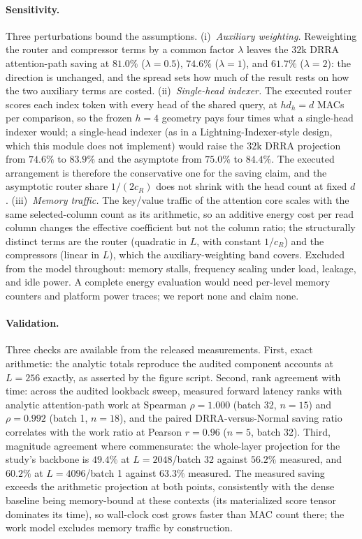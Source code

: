 \paragraph{Sensitivity.} Three perturbations bound the assumptions.
(i)~\emph{Auxiliary weighting.} Reweighting the router and compressor
terms by a common factor $\lambda$ leaves the $32$k DRRA attention-path
saving at $81.0\%$ ($\lambda{=}0.5$), $74.6\%$ ($\lambda{=}1$), and
$61.7\%$ ($\lambda{=}2$): the direction is unchanged, and the spread sets
how much of the result rests on how the two auxiliary terms are costed.
(ii)~\emph{Single-head indexer.} The executed router scores each index
token with every head of the shared query, at $h d_h = d$ MACs per
comparison, so the frozen $h{=}4$ geometry pays four times what a
single-head indexer would; a single-head indexer (as in a
Lightning-Indexer-style design, which this module does not implement)
would raise the $32$k DRRA projection from $74.6\%$ to $83.9\%$ and the
asymptote from $75.0\%$ to $84.4\%$. The executed
arrangement is therefore the conservative one for the saving claim, and
the asymptotic router share $1/(2 c_R)$ does not shrink with the head
count at fixed $d$.
(iii)~\emph{Memory traffic.} The key/value traffic of the attention core
scales with the same selected-column count as its arithmetic, so an
additive energy cost per read column changes the effective coefficient
but not the column ratio; the structurally distinct terms are the router
(quadratic in $L$, with constant $1/c_R$) and the compressors (linear in
$L$), which the auxiliary-weighting band covers. Excluded from the model
throughout: memory stalls, frequency scaling under load, leakage, and
idle power. A complete energy evaluation would need per-level memory
counters and platform power traces; we report none and claim none.

\paragraph{Validation.} Three checks are available from the released
measurements. First, exact arithmetic: the analytic totals reproduce the
audited component accounts at $L{=}256$ exactly, as asserted by the figure
script. Second, rank agreement with time: across the audited lookback
sweep, measured forward latency ranks with analytic attention-path work at
Spearman $\rho = 1.000$ (batch 32, $n{=}15$) and $\rho = 0.992$
(batch 1, $n{=}18$), and the paired DRRA-versus-Normal saving ratio
correlates with the work ratio at Pearson $r = 0.96$ ($n{=}5$, batch 32).
Third, magnitude agreement where commensurate: the whole-layer projection
for the study's backbone is $49.4\%$ at $L{=}2048$/batch 32 against
$56.2\%$ measured, and $60.2\%$ at $L{=}4096$/batch 1 against $63.3\%$
measured. The measured saving exceeds the arithmetic projection at both
points, consistently with the dense baseline being memory-bound at these
contexts (its materialized score tensor dominates its time), so wall-clock
cost grows faster than MAC count there; the work model excludes memory
traffic by construction.

